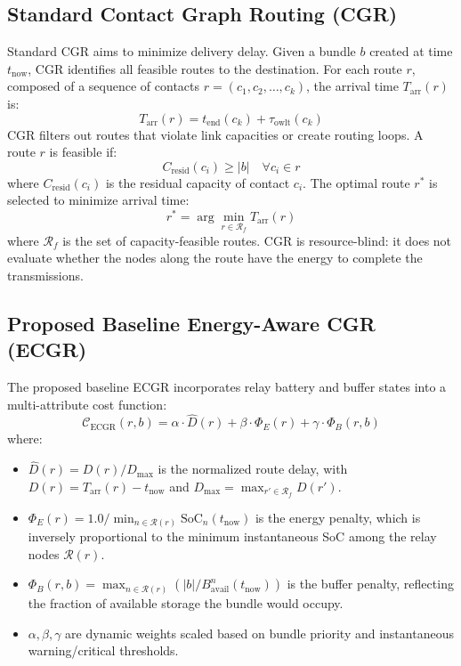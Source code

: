 \documentclass[a4paper,fleqn]{cas-dc}
\newcommand{\ecgr}{\textsf{ECGR}}
\begin{document}
\subsection{Standard Contact Graph Routing (CGR)}
Standard CGR aims to minimize delivery delay. Given a bundle $b$ created at time $t_{\text{now}}$, CGR identifies all feasible routes to the destination. For each route $r$, composed of a sequence of contacts $r = (c_1, c_2, \dots, c_k)$, the arrival time $T_{\text{arr}}(r)$ is:
\begin{equation}
    T_{\text{arr}}(r) = t_{\text{end}}(c_k) + \tau_{\text{owlt}}(c_k)
\end{equation}
CGR filters out routes that violate link capacities or create routing loops. A route $r$ is feasible if:
\begin{equation}
    C_{\text{resid}}(c_i) \geq |b| \quad \forall c_i \in r
\end{equation}
where $C_{\text{resid}}(c_i)$ is the residual capacity of contact $c_i$. The optimal route $r^*$ is selected to minimize arrival time:
\begin{equation}
    r^* = \arg\min_{r \in \mathcal{R}_f} T_{\text{arr}}(r)
\end{equation}
where $\mathcal{R}_f$ is the set of capacity-feasible routes. CGR is resource-blind: it does not evaluate whether the nodes along the route have the energy to complete the transmissions.

\subsection{Proposed Baseline Energy-Aware CGR (ECGR)}
The proposed baseline \ecgr{} incorporates relay battery and buffer states into a multi-attribute cost function:
\begin{equation}
    \mathcal{C}_{\text{ECGR}}(r, b) = \alpha \cdot \hat{D}(r) + \beta \cdot \Phi_E(r) + \gamma \cdot \Phi_B(r, b)
\end{equation}
where:
\begin{itemize}
    \item $\hat{D}(r) = D(r) / D_{\max}$ is the normalized route delay, with $D(r) = T_{\text{arr}}(r) - t_{\text{now}}$ and $D_{\max} = \max_{r' \in \mathcal{R}_f} D(r')$.
    \item $\Phi_E(r) = 1.0 / \min_{n \in \mathcal{R}(r)} \text{SoC}_n(t_{\text{now}})$ is the energy penalty, which is inversely proportional to the minimum instantaneous SoC among the relay nodes $\mathcal{R}(r)$.
    \item $\Phi_B(r, b) = \max_{n \in \mathcal{R}(r)} (|b| / B_{\text{avail}}^n(t_{\text{now}}))$ is the buffer penalty, reflecting the fraction of available storage the bundle would occupy.
    \item $\alpha, \beta, \gamma$ are dynamic weights scaled based on bundle priority and instantaneous warning/critical thresholds.
\end{itemize}
\end{document}
